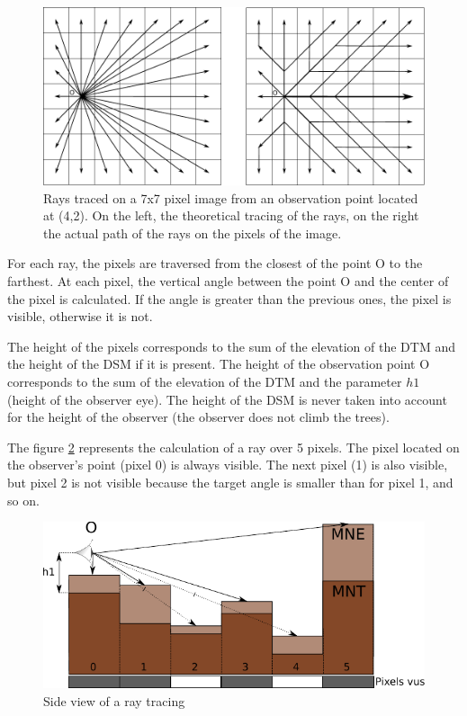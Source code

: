 \documentclass{report}
\begin{document}
\begin{figure}[H]
	\includegraphics[scale=0.8]{img/grid.pdf} 
	\caption{Rays traced on a 7x7 pixel image from an observation point located at (4,2). On the left, the theoretical tracing of the rays, on the right the actual path of the rays on the pixels of the image.}
	\label{grid}
\end{figure}

For each ray, the pixels are traversed from the closest of the point O to the farthest. At each pixel, the vertical angle between the point O and the center of the pixel is calculated. If the angle is greater than the previous ones, the pixel is visible, otherwise it is not.

The height of the pixels corresponds to the sum of the elevation of the DTM and the height of the DSM if it is present. The height of the observation point O corresponds to the sum of the elevation of the DTM and the parameter $h1$ (height of the observer eye). The height of the DSM is never taken into account for the height of the observer (the observer does not climb the trees).

The figure \ref{ray_side} represents the calculation of a ray over 5 pixels. The pixel located on the observer's point (pixel 0) is always visible. The next pixel (1) is also visible, but pixel 2 is not visible because the target angle is smaller than for pixel 1, and so on.

\begin{figure}[H]
	\includegraphics{img/ray_side-fr.pdf} 
	\caption{Side view of a ray tracing}
	\label{ray_side}
\end{figure}
\end{document}
